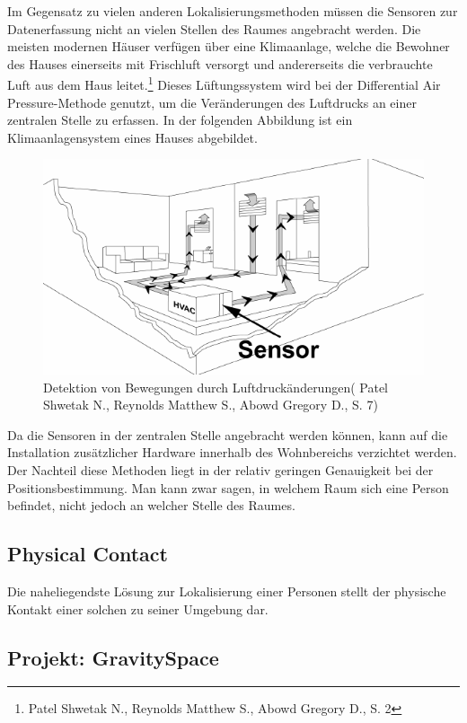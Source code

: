Im Gegensatz zu vielen anderen Lokalisierungsmethoden müssen die Sensoren zur Datenerfassung nicht an vielen Stellen des Raumes angebracht werden. Die meisten modernen Häuser verfügen über eine Klimaanlage, welche die Bewohner des Hauses einerseits mit Frischluft versorgt und andererseits die verbrauchte Luft aus dem Haus leitet.\footnote{Patel Shwetak N., Reynolds Matthew S., Abowd Gregory D., S. 2} Dieses Lüftungssystem wird bei der Differential Air Pressure-Methode genutzt, um die Veränderungen des Luftdrucks an einer zentralen Stelle zu erfassen. In der folgenden Abbildung ist ein Klimaanlagensystem eines Hauses abgebildet. 

\begin{figure}[H]
	\centering
	\includegraphics[width=1.0\textwidth]{pictures/dap_klima}
	\caption{Detektion von Bewegungen durch Luftdruckänderungen( Patel Shwetak N., Reynolds Matthew S., Abowd Gregory D., S. 7)}
\end{figure} 

Da die Sensoren in der zentralen Stelle angebracht werden können, kann auf die Installation zusätzlicher Hardware innerhalb des Wohnbereichs verzichtet werden. Der Nachteil diese Methoden liegt in der relativ geringen Genauigkeit bei der Positionsbestimmung. Man kann zwar sagen, in welchem Raum sich eine Person befindet, nicht jedoch an welcher Stelle des Raumes.

\subsection{Physical Contact}
Die naheliegendste Lösung zur Lokalisierung einer Personen stellt der physische Kontakt einer solchen zu seiner Umgebung dar. 
\subsection{Projekt: GravitySpace}
